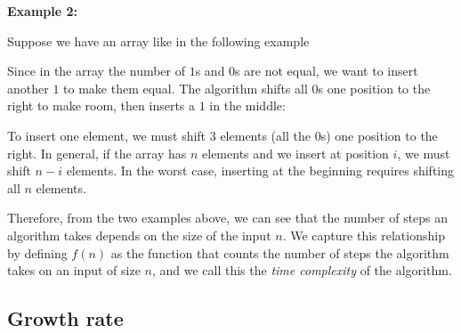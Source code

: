 \documentclass[12pt,a4paper,openany]{article}
\begin{document}
\textbf{Example 2:}

Suppose we have an array like in the following example

\begin{center}
\end{center}

Since in the array the number of $1$s and $0$s are not equal, we want to insert another $1$ to make them equal. The algorithm shifts all $0$s one position to the right to make room, then inserts a $1$ in the middle:

\begin{center}
\end{center}

To insert one element, we must shift $3$ elements (all the $0$s) one position to the right. In general, if the array has $n$ elements and we insert at position $i$, we must shift $n - i$ elements. In the worst case, inserting at the beginning requires shifting all $n$ elements.


Therefore, from the two examples above, we can see that the number of steps an algorithm takes depends on the size of the input $n$. We capture this relationship by defining $f(n)$ as the function that counts the number of steps the algorithm takes on an input of size $n$, and we call this the \emph{time complexity} of the algorithm. 

\subsection{Growth rate}
\end{document}
